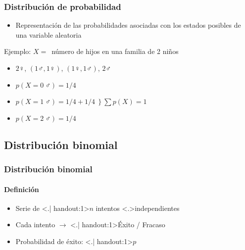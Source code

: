 \documentclass[gray,handout,mathserif]{beamer}
\begin{document}
\begin{frame}[label=probadist]
   \frametitle{Distribuci\'on de probabilidad}
   \begin{itemize}
      \item Representaci\'on de las probabilidades asociadas con los estados posibles de una variable aleatoria
   \end{itemize}
   \begin{exampleblock}{Ejemplo: $X=$~n\'umero de hijos en una familia de 2 ni\~nos}
      \begin{itemize}
         \item $2\female$, $(1\male, 1\female)$, $(1\female, 1\male)$, $2\male$
         \item $p(X = 0~\male) = 1/4$
         \item $ p(X = 1~\male) = 1/4 + 1/4 ~~ \Bigg\}~  \sum p(X)=1$ 
         \item $p(X = 2~\male) = 1/4$
      \end{itemize}
   \end{exampleblock}
\end{frame}%


\subsection[Binomial]{Distribuci\'on binomial}

\begin{frame}[label=binom1]
   \frametitle{Distribuci\'on binomial}
   \framesubtitle{Definici\'on}
   \begin{itemize}[<+-| handout:1>]
      \item Serie de \alert<.| handout:1>{$n$} intentos \alert<.>{independientes}
      \item Cada intento $\rightarrow$ \alert<.| handout:1>{\'Exito / Fracaso}
      \item Probabilidad de \'exito: \alert<.| handout:1>{$p$}
   \end{itemize}
\end{frame}%
\end{document}
